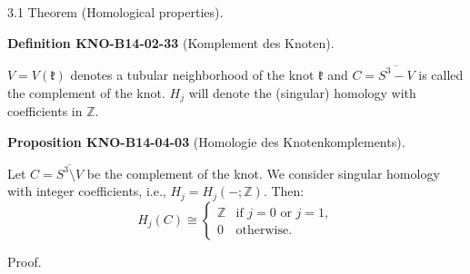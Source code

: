 \documentclass[10pt, letterpaper]{article}
\newcommand{\CustomHeading}[3]{%
  \par\medskip\noindent%
  \textbf{#1 #2} \textnormal{(#3)}.\enskip%
}
\newenvironment{DEF}[2]{\begin{unitbox}\CustomHeading{Definition}{#1}{#2}}{\end{unitbox}}
\newenvironment{PROP}[2]{\begin{unitbox}\CustomHeading{Proposition}{#1}{#2}}{\end{unitbox}}
\begin{document}
3.1 Theorem (Homological properties).


\begin{DEF}{KNO-B14-02-33}{Komplement des Knoten}
$V=V(\mathfrak{k})$ denotes a tubular neighborhood of the knot $\mathfrak{k}$ and $C=\overline{S^{3}-V}$ is called the complement of the knot. $H_{j}$ will denote the (singular) homology with coefficients in $\mathbb{Z}$.
\end{DEF}



\begin{PROP}{KNO-B14-04-03}{Homologie des Knotenkomplements}
Let \( C = \overline{S^3 \setminus V} \) be the complement of the knot. We consider singular homology with integer coefficients, i.e., \( H_j = H_j(-; \mathbb{Z}) \). Then:
\[
H_j(C) \cong
\begin{cases}
\mathbb{Z} & \text{if } j = 0 \text{ or } j = 1, \\
0 & \text{otherwise}.
\end{cases}
\]
\end{PROP}

Proof.
\end{document}

